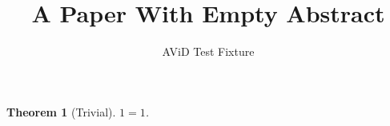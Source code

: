 \documentclass{article}
\title{A Paper With Empty Abstract}
\author{AViD Test Fixture}
\newtheorem{theorem}{Theorem}
\begin{document}
\maketitle

\begin{abstract}
\end{abstract}

\begin{theorem}[Trivial]
$1 = 1$.
\end{theorem}
\end{document}
